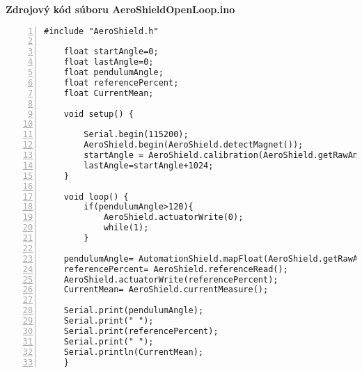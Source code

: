 \LARGE\bf{Zdrojový kód súboru AeroShieldOpenLoop.ino}
\label{AeroShieldOpenLoop.ino}
\vspace{1cm}
\begin{lstlisting}[numbers=left,basicstyle=\scriptsize,caption={Zdrojový kód súboru AeroShieldOpenLoop.ino.},captionpos=b]	
	#include "AeroShield.h" 
	
	float startAngle=0; 
	float lastAngle=0; 
	float pendulumAngle;  
	float referencePercent;  
	float CurrentMean; 
	
	void setup() {
		
		Serial.begin(115200);   
		AeroShield.begin(AeroShield.detectMagnet());
		startAngle = AeroShield.calibration(AeroShield.getRawAngle());
		lastAngle=startAngle+1024;  
	}
	
	void loop() {
		if(pendulumAngle>120){
			AeroShield.actuatorWrite(0);
			while(1);
		}
		
	pendulumAngle= AutomationShield.mapFloat(AeroShield.getRawAngle(),startAngle,lastAngle,0.00,90.00);  
	referencePercent= AeroShield.referenceRead(); 
	AeroShield.actuatorWrite(referencePercent);    
	CurrentMean= AeroShield.currentMeasure();

	Serial.print(pendulumAngle);  
	Serial.print(" ");
	Serial.print(referencePercent); 
	Serial.print(" ");
	Serial.println(CurrentMean);
	}
\end{lstlisting}